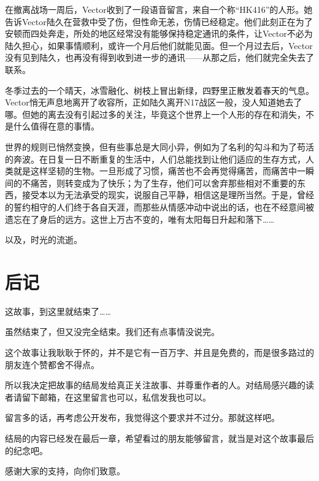 在撤离战场一周后，Vector收到了一段语音留言，来自一个称“HK416”的人形。她告诉Vector陆久在营救中受了伤，但性命无恙，伤情已经稳定。他们此刻正在为了安顿而四处奔走，所处的地区经常没有能够保持稳定通讯的条件，让Vector不必为陆久担心，如果事情顺利，或许一个月后他们就能见面。但一个月过去后，Vector没有见到陆久，也再没有得到收到进一步的通讯——从那之后，他们就完全失去了联系。

冬季过去的一个晴天，冰雪融化、树枝上冒出新绿，四野里正散发着春天的气息。Vector悄无声息地离开了收容所，正如陆久离开N17战区一般，没人知道她去了哪。但她的离去没有引起过多的关注，毕竟这个世界上一个人形的存在和消失，不是什么值得在意的事情。

世界的规则已悄然变换，但有些事总是大同小异，例如为了名利的勾斗和为了苟活的奔波。在日复一日不断重复的生活中，人们总能找到让他们适应的生存方式，人类就是这样坚韧的生物。一旦形成了习惯，痛苦也不会再觉得痛苦，而痛苦中一瞬间的不痛苦，则转变成为了快乐；为了生存，他们可以舍弃那些相对不重要的东西，接受本以为无法承受的现实，说服自己平静，相信这是理所当然。于是，曾经的誓约相守的人们终于各自天涯，而那些从情感冲动中说出的话，也在不经意间被遗忘在了身后的远方。这世上万古不变的，唯有太阳每日升起和落下……

以及，时光的流逝。

\section*{后记}

这故事，到这里就结束了……

虽然结束了，但又没完全结束。我们还有点事情没说完。

这个故事让我耿耿于怀的，并不是它有一百万字、并且是免费的，而是很多路过的朋友连个赞都舍不得点。

所以我决定把故事的结局发给真正关注故事、并尊重作者的人。对结局感兴趣的读者请留下邮箱，在这里留言也可以，私信发我也可以。

留言多的话，再考虑公开发布，我觉得这个要求并不过分。那就这样吧。

\lineseparator

结局的内容已经发在最后一章，希望看过的朋友能够留言，就当是对这个故事最后的纪念吧。

感谢大家的支持，向你们致意。